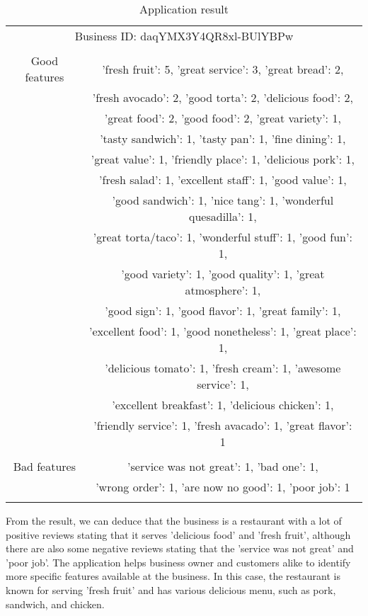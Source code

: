     \begin{table}
        \centering
        \tiny
        \caption{Application result}
        \begin{tabular}{|c|c|}
            \hline
            \multicolumn{2}{|c|}{Business ID: daqYMX3Y4QR8xl-BUlYBPw}\\
            \multicolumn{2}{|c|}{ }\\
            \hline
            Good features &'fresh fruit': 5, 'great service': 3, 'great bread': 2,\\
            &'fresh avocado': 2, 'good torta': 2, 'delicious food': 2,\\
            &'great food': 2, 'good food': 2, 'great variety': 1,\\
            &'tasty sandwich': 1, 'tasty pan': 1, 'fine dining': 1,\\
            &'great value': 1, 'friendly place': 1, 'delicious pork': 1,\\
            &'fresh salad': 1, 'excellent staff': 1, 'good value': 1,\\
            &'good sandwich': 1, 'nice tang': 1, 'wonderful quesadilla': 1,\\
            &'great torta/taco': 1, 'wonderful stuff': 1, 'good fun': 1,\\
            &'good variety': 1, 'good quality': 1, 'great atmosphere': 1,\\
            &'good sign': 1, 'good flavor': 1, 'great family': 1,\\
            &'excellent food': 1, 'good nonetheless': 1, 'great place': 1,\\
            &'delicious tomato': 1, 'fresh cream': 1, 'awesome service': 1,\\
            &'excellent breakfast': 1, 'delicious chicken': 1,\\
            &'friendly service': 1, 'fresh avacado': 1, 'great flavor': 1\\
            &\\
            \hline
            Bad features &'service was not great': 1, 'bad one': 1,\\
            &'wrong order': 1, 'are now no good': 1, 'poor job': 1\\
            &\\
            \hline
             
        \end{tabular}
    \end{table}

From the result, we can deduce that the business is a restaurant with a lot of positive reviews stating that it serves 'delicious food' and 'fresh fruit', although there are also some negative reviews stating that the 'service was not great' and 'poor job'. The application helps business owner and customers alike to identify more specific features available at the business. In this case, the restaurant is known for serving 'fresh fruit' and has various delicious menu, such as pork, sandwich, and chicken.
